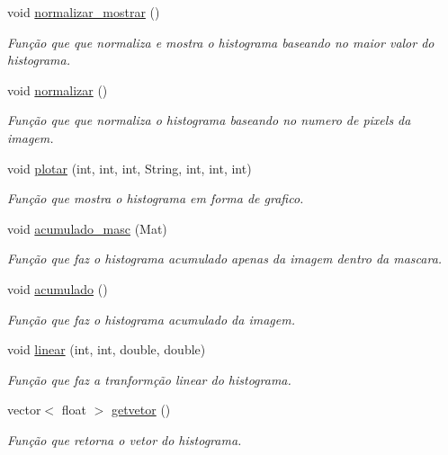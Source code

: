 \begin{DoxyCompactItemize}
void \mbox{\hyperlink{classhistograma_a1a0f84171cac20284063c480e4f1e684}{normalizar\+\_\+mostrar}} ()
\begin{DoxyCompactList}\small\item\em Função que que normaliza e mostra o histograma baseando no maior valor do histograma. \end{DoxyCompactList}\item 
void \mbox{\hyperlink{classhistograma_ac15a97ce5bd68648191c0416a7741728}{normalizar}} ()
\begin{DoxyCompactList}\small\item\em Função que que normaliza o histograma baseando no numero de pixels da imagem. \end{DoxyCompactList}\item 
void \mbox{\hyperlink{classhistograma_a52b6c866e8ec9de71f6527e1cb1037da}{plotar}} (int, int, int, String, int, int, int)
\begin{DoxyCompactList}\small\item\em Função que mostra o histograma em forma de grafico. \end{DoxyCompactList}\item 
void \mbox{\hyperlink{classhistograma_a6ab0c9af1a0448ceb27cb6484acfb692}{acumulado\+\_\+masc}} (Mat)
\begin{DoxyCompactList}\small\item\em Função que faz o histograma acumulado apenas da imagem dentro da mascara. \end{DoxyCompactList}\item 
void \mbox{\hyperlink{classhistograma_aed006c903fb0c0403708ef34843b954b}{acumulado}} ()
\begin{DoxyCompactList}\small\item\em Função que faz o histograma acumulado da imagem. \end{DoxyCompactList}\item 
void \mbox{\hyperlink{classhistograma_a540d01e42181bb08e3f9471d1ba8a79b}{linear}} (int, int, double, double)
\begin{DoxyCompactList}\small\item\em Função que faz a tranformção linear do histograma. \end{DoxyCompactList}\item 
vector$<$ float $>$ \mbox{\hyperlink{classhistograma_a79bb95f6bc4ce9f3e12a94419a8ffaab}{getvetor}} ()
\begin{DoxyCompactList}\small\item\em Função que retorna o vetor do histograma. \end{DoxyCompactList}\item 

\end{DoxyCompactItemize}
